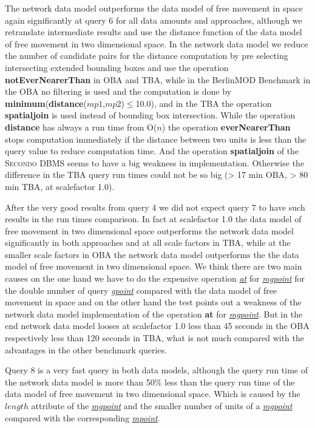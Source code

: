 \documentclass[a4paper]{article}
\newcommand{\secondo}{\textsc{Secondo}}
\newcommand{\bmodb} {BerlinMOD Benchmark}
\newcommand{\op}[1]{\textbf{#1}}
\newcommand{\dt}[1]{\textsl{\underline{#1}}}
\begin{document}
{The network data model outperforms the data model of free movement in space again
significantly at query 6 for
all data amounts and approaches, although we retranslate
intermediate results and use the distance function of the data model of free movement
in two dimensional space. In the network data model we reduce the number of candidate
pairs for the distance computation by pre selecting intersecting extended bounding boxes
and use the operation \op{notEverNearerThan} in OBA and TBA, while in the \bmodb{}
in the OBA no filtering is used and the computation is done by
\op{minimum}(\op{distance}($mp1$,$mp2$)$\leq$10.0), and in the TBA the operation
\op{spatialjoin} is used instead of bounding box intersection. While the operation
\op{distance} has always a run time from O($n$) the operation \op{everNearerThan}
stops computation immediately if the distance between two units is less than the
query value to reduce computation time. And the operation \op{spatialjoin} of the
\secondo{} DBMS seems to have a big weakness in implementation. Otherwise the
difference in the TBA query run times could not be so big (> 17 min OBA, > 80 min TBA,
at scalefactor 1.0).

After the very good results from query 4 we did not expect query 7 to have such
results in the run times comparison. In fact at scalefactor 1.0 the data model of free movement
in two dimensional space outperforms the network data model significantly in both
approaches and at all scale factors in TBA, while at the smaller scale factors in
OBA the network data model outperforms the the data model of free movement in
two dimensional space. We think there are two main causes on the one hand we
have to do the expensive operation \dt{at} for \dt{mgpoint} for the double number
of query \dt{gpoint} compared with the data model of free movement in space and
on the other hand the test points out a weakness of the network data model
implementation of the operation \op{at} for \dt{mgpoint}. But in the end network
data model looses at scalefactor 1.0 less than 45 seconds in the OBA respectively less
than 120 seconds in TBA, what is not much compared with the advantages in the
other benchmark queries.

Query 8 is a very fast query in both data models, although the query run time of
the network data model is more than 50\% less than the query run time of the
data model of free movement in two dimensional space. Which is caused by the
$length$ attribute of the \dt{mgpoint} and the smaller number of units of a
\dt{mgpoint} compared with the corresponding \dt{mpoint}.

}
\end{document}
